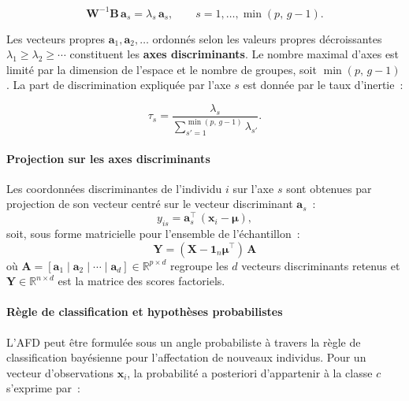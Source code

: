 \documentclass[12pt, a4paper, oneside]{report}
\begin{document}
	\begin{equation}
		\mathbf{W}^{-1}\mathbf{B}\,\mathbf{a}_s = \lambda_s\,\mathbf{a}_s, \qquad s = 1, \ldots, \min(p,\, g-1).
		\label{eq:vp_standard}
	\end{equation}
	
	Les vecteurs propres $\mathbf{a}_1, \mathbf{a}_2, \ldots$ ordonnés selon les valeurs propres décroissantes $\lambda_1 \geq \lambda_2 \geq \cdots$ constituent les \textbf{axes discriminants}. Le nombre maximal d'axes est limité par la dimension de l'espace et le nombre de groupes, soit $\min(p,\, g-1)$. La part de discrimination expliquée par l'axe $s$ est donnée par le taux d'inertie~:
	
	\begin{equation}
		\tau_s = \frac{\lambda_s}{\displaystyle\sum_{s'=1}^{\min(p,\,g-1)} \lambda_{s'}}.
		\label{eq:inertie_afd}
	\end{equation}
	
	\paragraph{Projection sur les axes discriminants}
	Les coordonnées discriminantes de l'individu $i$ sur l'axe $s$ sont obtenues par projection de son vecteur centré sur le vecteur discriminant $\mathbf{a}_s$~:
	\begin{equation}
		y_{is} = \mathbf{a}_s^{\top}\,(\mathbf{x}_i - \boldsymbol{\mu}),
		\label{eq:projection}
	\end{equation}
	soit, sous forme matricielle pour l'ensemble de l'échantillon~:
	\begin{equation}
		\boxed{\mathbf{Y} = (\mathbf{X} - \mathbf{1}_n\boldsymbol{\mu}^{\top})\,\mathbf{A}}
		\label{eq:proj_matrice}
	\end{equation}
	où $\mathbf{A} = [\mathbf{a}_1 \mid \mathbf{a}_2 \mid \cdots \mid \mathbf{a}_d] \in \mathbb{R}^{p \times d}$ regroupe les $d$ vecteurs discriminants retenus et $\mathbf{Y} \in \mathbb{R}^{n \times d}$ est la matrice des scores factoriels.
	
	\paragraph{Règle de classification et hypothèses probabilistes}
	L'AFD peut être formulée sous un angle probabiliste à travers la règle de classification bayésienne pour l'affectation de nouveaux individus. Pour un vecteur d'observations $\mathbf{x}_i$, la probabilité a posteriori d'appartenir à la classe $c$ s'exprime par~:
	
\end{document}
